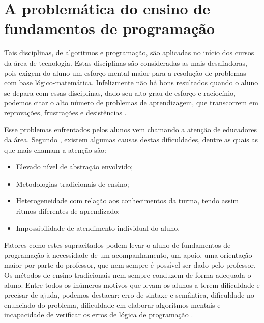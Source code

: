 \documentclass[pnumabnt,normaltoc,espacoumemeio,capchap]{abnt}
\begin{document}
\section{A problemática do ensino de fundamentos de programação}
\par Tais disciplinas, de algoritmos e programação, são aplicadas no início dos cursos da área de tecnologia. Estas disciplinas são consideradas as mais desafiadoras, pois exigem do aluno um esforço mental maior para a resolução de problemas com base lógico-matemática. Infelizmente não há bons resultados quando o aluno se depara com essas disciplinas, dado seu alto grau de esforço e raciocínio, podemos citar o alto número de problemas de aprendizagem, que transcorrem em reprovações, frustrações e desistências \cite{DE08}.
\par Esse problemas enfrentados pelos alunos vem chamando a atenção de educadores da área. Segundo , existem algumas causas destas dificuldades, dentre as quais as que mais chamam a atenção são:
\begin{itemize}
	\item Elevado nível de abstração envolvido;
	\item Metodologias tradicionais de ensino;
	\item Heterogeneidade com relação aos conhecimentos da turma, tendo assim ritmos diferentes de aprendizado;
	\item Impossibilidade de atendimento individual do aluno. 
\end{itemize}
\par Fatores como estes supracitados podem levar o aluno de fundamentos de programação à necessidade de um acompanhamento, um apoio, uma orientação maior por parte do professor, que nem sempre é possível ser dado pelo professor. Os métodos de ensino tradicionais nem sempre conduzem de forma adequada o aluno. Entre todos os inúmeros motivos que levam os alunos a terem dificuldade e precisar de ajuda, podemos destacar: erro de sintaxe e semântica, dificuldade no enunciado do problema, dificuldade em elaborar algoritmos mentais e incapacidade de verificar os erros de lógica de programação \cite{GM00}.
\end{document}
